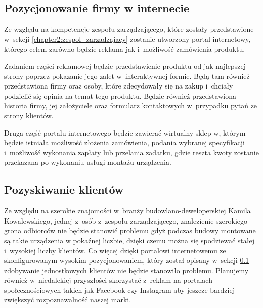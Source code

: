 \documentclass[../main.tex]{subfiles}
\begin{document}
 {

    \subsection{Pozycjonowanie firmy w internecie}
    \label{chapter4:plan_marketingowy:pozycjonowanie} {
        Ze względu na kompetencje zespołu zarządzającego, które zostały przedstawione
        w~sekcji \ref{chapter2:zespol_zarzadzajacy} zostanie utworzony portal
        internetowy, którego celem zarówno będzie reklama jak i~możliwość zamówienia
        produktu.

        Zadaniem części reklamowej będzie przedstawienie produktu od jak najlepszej
        strony poprzez pokazanie jego zalet w~interaktywnej formie. Będą tam również
        przedstawiona firmy oraz osoby, które zdecydowały się na zakup i~chciały
        podzielić się opinia na temat tego produktu. Będzie również przedstawiona
        historia firmy, jej założyciele oraz formularz kontaktowych w~przypadku pytań
        ze strony klientów.

        Druga część portalu internetowego będzie zawierać wirtualny sklep w, którym
        będzie istniała możliwość złożenia zamówienia, podania wybranej specyfikacji
        i~możliwość wykonania zapłaty lub przelania zadatku, gdzie reszta kwoty zostanie
        przekazana po wykonaniu usługi montażu urządzenia.
    }

    \subsection{Pozyskiwanie klientów}
    \label{chapter4:plan_marketingowy:pozyskiwanie_klientow} {
        Ze względu na szerokie znajomości w~branży budowlano-deweloperskiej Kamila
        Kowalewskiego, jednej z~osób z~zespołu zarządzającego, znalezienie szerokiego
        grona odbiorców nie będzie stanowić problemu gdyż podczas budowy montowane są
        takie urządzenia w pokaźnej liczbie, dzięki czemu można się spodziewać stałej
        i~wysokiej liczby klientów. Co więcej dzięki portalowi internetowemu ze
        skonfigurowanym wysokim pozycjonowaniem, który został opisany w~sekcji
        \ref{chapter4:plan_marketingowy:pozycjonowanie} zdobywanie jednostkowych
        klientów nie będzie stanowiło problemu. Planujemy również w~niedalekiej
        przyszłości skorzystać z~reklam na portalach społecznościowych takich jak
        Facebook\cite{facebook} czy Instagram\cite{instagram} aby jeszcze bardziej
        zwiększyć rozpoznawalność naszej marki.
    }

}
\end{document}
